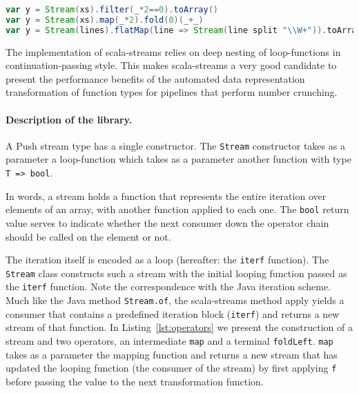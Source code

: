 \begin{lstlisting}[language=Scala, caption=Example uses of scala-streams.]
var y = Stream(xs).filter(_*2==0).toArray()
var y = Stream(xs).map(_*2).fold(0)(_+_)
var y = Stream(lines).flatMap(line => Stream(line split "\\W+")).toArray
\end{lstlisting}

The implementation of scala-streams relies on deep nesting of loop-functions in
continuation-passing style. This makes scala-streams a very good candidate to
present the performance benefits of the automated data representation
transformation of function types for pipelines that perform number crunching.

\paragraph{Description of the library. }
A Push stream type has a single constructor. The \verb|Stream| constructor takes
as a parameter a loop-function which takes as a parameter another function with
type \verb|T => bool|.

In words, a stream holds a function that represents the entire iteration over
elements of an array, with another function applied to each one.  The
\verb|bool| return value serves to indicate whether the next consumer down the
operator chain should be called on the element or not.

The iteration itself is encoded as a loop (hereafter: the \verb|iterf|
function). The \verb|Stream| class constructs such a stream with the initial
looping function passed as the \verb|iterf| function. Note the correspondence
with the Java iteration scheme. Much like the Java method \verb|Stream.of|, the
scala-streams method apply yields a consumer that contains a predefined
iteration block (\verb|iterf|) and returns a new stream of that function. In
Listing~\ref{lst:operators} we present the construction of a stream and two
operators, an intermediate \verb|map| and a terminal \verb|foldLeft|. \verb|map|
takes as a parameter the mapping function and returns a new stream that has
updated the looping function (the consumer of the stream) by first applying
\verb|f| before passing the value to the next transformation function.

